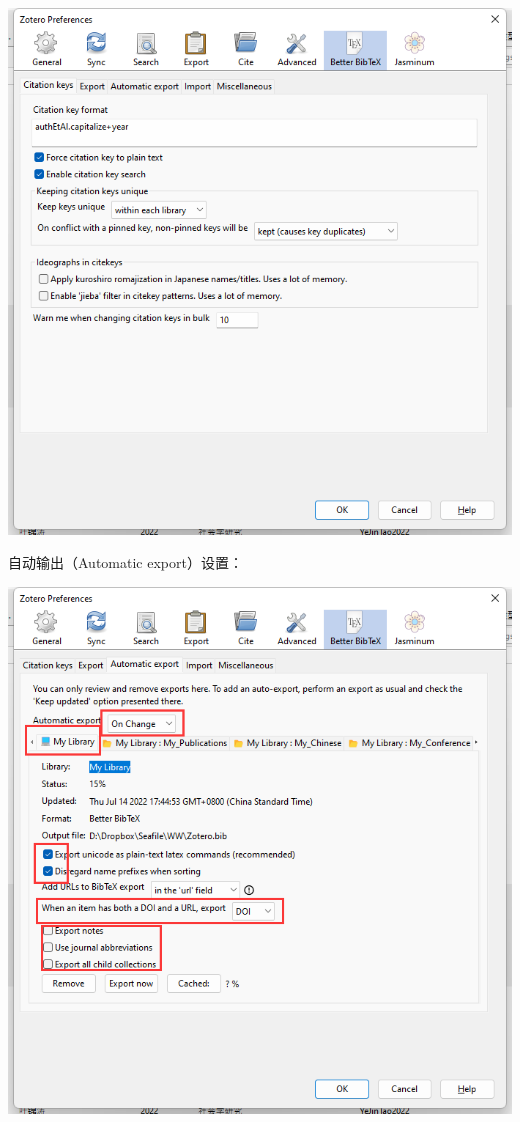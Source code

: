 \documentclass[
  letterpaper,
  DIV=11,
  numbers=noendperiod,
  oneside]{scrreprt}
\begin{document}
\includegraphics{./images/zotero_bibtex1.png}

自动输出（Automatic export）设置：

\includegraphics{./images/zotero_bibtex2.png}
\end{document}
